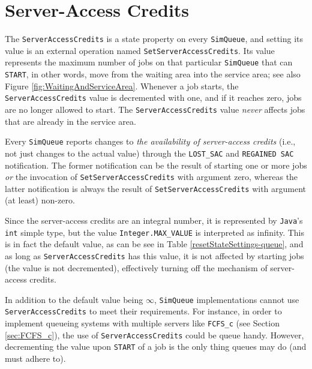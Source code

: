 \documentclass[12pt]{book}
\begin{document}
\section{Server-Access Credits}
\label{sec:guided:sac}

The \lstinline|ServerAccessCredits|
  is a state property on every \lstinline|SimQueue|,
  and setting its value is an
  external operation
  named \lstinline|SetServerAccessCredits|.
Its value represents the maximum number of
  jobs on that particular \lstinline|SimQueue|
  that can \lstinline|START|,
  in other words,
  move from the waiting area into
  the service area;
  see also Figure \ref{fig:WaitingAndServiceArea}.
Whenever a job starts,
  the \lstinline|ServerAccessCredits| value
  is decremented with one,
  and if it reaches zero,
  jobs are no longer allowed to start.
The \lstinline|ServerAccessCredits| value
  {\em never\/}
  affects jobs that are already in the
  service area.

Every \lstinline|SimQueue| reports
  changes to {\em the availability of server-access credits\/}
  (i.e., not just changes to the actual value)
  through the \lstinline|LOST_SAC|
  and \lstinline|REGAINED SAC|
  notification.
The former notification can be the result of
  starting one or more jobs
  {\em or\/}
  the invocation of \lstinline|SetServerAccessCredits|
  with argument zero,
  whereas the latter notification is always
  the result of \lstinline|SetServerAccessCredits|
  with argument (at least) non-zero.

Since the server-access credits are an integral number,
  it is represented by \lstinline|Java|'s
  \lstinline|int| simple type,
  but the value
  \lstinline|Integer.MAX_VALUE|
  is interpreted as infinity.
This is in fact the default value,
  as can be see in Table \ref{resetStateSettings-queue},
  and as long as \lstinline|ServerAccessCredits|
  has this value,
  it is not affected by starting jobs
  (the value is not decremented),
  effectively turning off the mechanism of
  server-access credits.

In addition to the default value being $\infty$,
  \lstinline|SimQueue| implementations
  cannot use \lstinline|ServerAccessCredits|
  to meet their requirements.
For instance, in order to implement queueing
  systems with multiple servers like
  \lstinline|FCFS_c|
  (see Section \ref{sec:FCFS_c}),
  the use of
  \lstinline|ServerAccessCredits|
  could be queue handy.
However, decrementing the value upon \lstinline|START|
  of a job is the only thing queues may do
  (and must adhere to).
\end{document}
